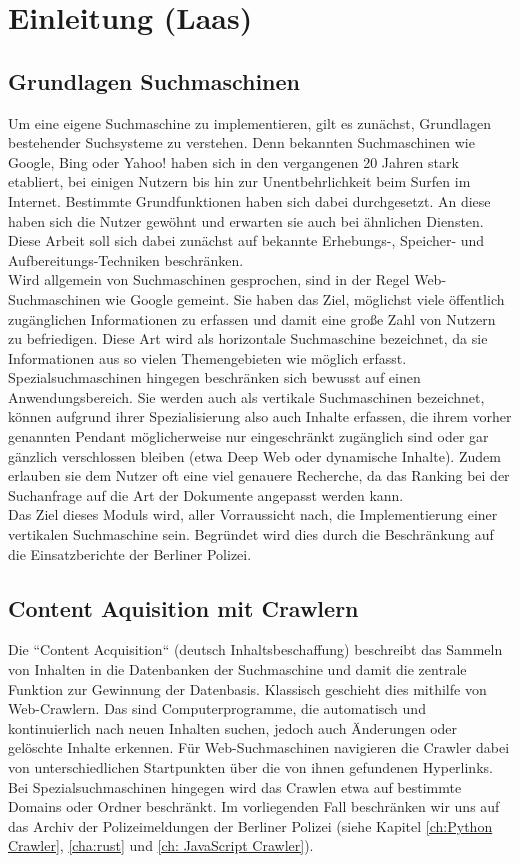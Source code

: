 \chapter{Einleitung \small(Laas)}

\section{Grundlagen Suchmaschinen}
Um eine eigene Suchmaschine zu implementieren, gilt es zunächst, Grundlagen bestehender Suchsysteme zu verstehen. Denn bekannten Suchmaschinen wie Google, Bing oder Yahoo! haben sich in den vergangenen 20 Jahren stark etabliert, bei einigen Nutzern bis hin zur Unentbehrlichkeit beim Surfen im Internet. Bestimmte Grundfunktionen haben sich dabei durchgesetzt. An diese haben sich die Nutzer gewöhnt und erwarten sie auch bei ähnlichen Diensten. Diese Arbeit soll sich dabei zunächst auf bekannte Erhebungs-, Speicher- und Aufbereitungs-Techniken beschränken.\\
Wird allgemein von Suchmaschinen gesprochen, sind in der Regel Web-Suchmaschinen wie Google gemeint. Sie haben das Ziel, möglichst viele öffentlich zugänglichen Informationen zu erfassen und damit eine große Zahl von Nutzern zu befriedigen. Diese Art wird als horizontale Suchmaschine bezeichnet, da sie Informationen aus so vielen Themengebieten wie möglich erfasst.\\
Spezialsuchmaschinen hingegen beschränken sich bewusst auf einen Anwendungsbereich. Sie werden auch als vertikale Suchmaschinen bezeichnet, können aufgrund ihrer Spezialisierung also auch Inhalte erfassen, die ihrem vorher genannten Pendant möglicherweise nur eingeschränkt zugänglich sind oder gar gänzlich verschlossen bleiben (etwa Deep Web oder dynamische Inhalte). Zudem erlauben sie dem Nutzer oft eine viel genauere Recherche, da das Ranking bei der Suchanfrage auf die Art der Dokumente angepasst werden kann.\\
Das Ziel dieses Moduls wird, aller Vorraussicht nach, die Implementierung einer vertikalen Suchmaschine sein. Begründet wird dies durch die Beschränkung auf die Einsatzberichte der Berliner Polizei. \cite{suchmverst} \cite{boldsuche}

\section{Content Aquisition mit Crawlern}
Die ``Content Acquisition`` (deutsch Inhaltsbeschaffung) beschreibt das Sammeln von Inhalten in die Datenbanken der Suchmaschine und damit die zentrale Funktion zur Gewinnung der Datenbasis. Klassisch geschieht dies mithilfe von Web-Crawlern. Das sind Computerprogramme, die automatisch und kontinuierlich nach neuen Inhalten suchen, jedoch auch Änderungen oder gelöschte Inhalte erkennen. Für Web-Suchmaschinen navigieren die Crawler dabei von unterschiedlichen Startpunkten über die von ihnen gefundenen Hyperlinks. Bei Spezialsuchmaschinen hingegen wird das Crawlen etwa auf bestimmte Domains oder Ordner beschränkt. Im vorliegenden Fall beschränken wir uns auf das Archiv der Polizeimeldungen der Berliner Polizei (siehe Kapitel \ref{ch:Python Crawler}, \ref{cha:rust} und \ref{ch: JavaScript Crawler}). \cite{suchmverst}

